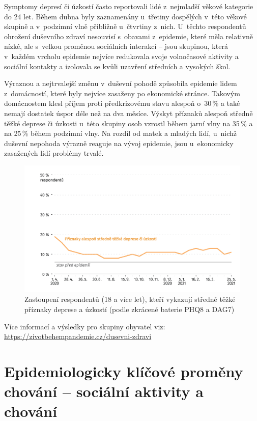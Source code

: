 Symptomy depresí či úzkostí často reportovali lidé z~nejmladší věkové kategorie do 24 let. Během dubna byly zaznamenány u~třetiny dospělých v této věkové skupině a v podzimní vlně přibližně u~čtvrtiny z~nich. U~těchto respondentů ohrožení duševního zdraví nesouvisí s obavami z epidemie, které měla relativně nízké, ale s velkou proměnou sociálních interakcí – jsou skupinou, která v každém vrcholu epidemie nejvíce redukovala svoje volnočasové aktivity a sociální kontakty a izolovala se kvůli uzavření středních a vysokých škol.

Výraznou a nejtrvalejší změnu v~duševní pohodě způsobila epidemie lidem z domácností, které byly nejvíce zasaženy po ekonomické stránce. Takovým domácnostem klesl příjem proti předkrizovému stavu alespoň o~30\,\% a také nemají dostatek úspor déle než na dva měsíce. Výskyt příznaků alespoň středně těžké deprese či úzkosti u~této skupiny osob vzrostl během jarní vlny na 35\,\% a na 25\,\% během podzimní vlny. Na rozdíl od matek a mladých lidí, u~nichž duševní nepohoda výrazně reaguje na vývoj epidemie, jsou u~ekonomicky zasažených lidí problémy trvalé.


\begin{figure}[ht]
    \centering
    \includegraphics[width=\textwidth]{./pic/zbp-graf2.png}
    \caption{Zastoupení respondentů (18 a více let), kteří vykazují středně těžké příznaky deprese a úzkostí (podle zkrácené baterie PHQ8 a DAG7)}
    \label{fig:zbp2}
\end{figure}

Více informací a výsledky pro skupiny obyvatel viz: \url{https://zivotbehempandemie.cz/dusevni-zdravi}


\section*{Epidemiologicky klíčové proměny chování – sociální aktivity a chování}
\label{Epidemi_promeny}

